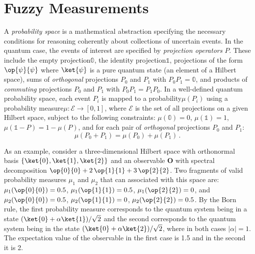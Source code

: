 \documentclass[english,reprint, aps, prl,superscriptaddress, showpacs,
showkeys, longbibliography, amsmath, amssymb]{revtex4-1}
\theoremstyle{plain}
\theoremstyle{definition}
\newcommand{\events}{\ensuremath{\mathcal{E}}}
\newcommand{\proj}[1]{\op{#1}{#1}}
\newcommand{\nb}{\nolinebreak[1] }
\begin{document}
\section{Fuzzy Measurements}
 \label{sec:fuzzy}
A \emph{probability space} is a mathematical abstraction specifying
the necessary conditions for reasoning coherently about collections of
uncertain events\nb\cite{Kolmogorov1950,544199,Griffiths2003,Grabisch2016}. In the quantum case, the
events of interest are specified by \emph{projection operators}
$P$. These include the empty projection\nb$\mathbb{0}$, the identity
projection\nb$\mathbb{1}$, projections of the form $\proj{\psi}$ where
$\ket{\psi}$ is a pure quantum state (an element of a Hilbert space),
sums of \emph{orthogonal} projections $P_0$ and $P_1$ with
$P_0P_1=\mathbb{0}$, and products of \emph{commuting} projections
$P_0$ and $P_1$ with $P_0P_1=P_1P_0$. In a well-defined quantum
probability
space\nb\cite{10.2307/2308516,gleason1957,Redhead1987-REDINA,Maassen2010},
each event $P_{i}$ is mapped to a probability\nb$\mu(P_{i})$ using
a probability measure\nb$\mu:\events\rightarrow[0,1]$, where $\events$
is the set of all projections on a given Hilbert space, subject to
the following constraints: $\mu(\mathbb{0})=0$, $\mu(\mathbb{1})=1$,
$\mu\left(\mathbb{1}-P\right)=1-\mu\left(P\right)$, and for each pair
of \emph{orthogonal} projections $P_{0}$ and $P_{1}$:
\begin{equation}
{\mu}\left(P_{0}+P_{1}\right)={\mu}\left(P_{0}\right)+{\mu}\left(P_{1}\right)\,.\label{eq:QuantumProbability-Addition}
\end{equation}

As an example, consider a three-dimensional Hilbert space with
orthonormal basis $\{\ket{0},\ket{1},\ket{2}\}$ and an observable
$\mathbf{O}$ with spectral decomposition
$\proj{0} + 2\,\proj{1} + 3\,\proj{2}$. Two fragments of valid
probability measures $\mu_1$ and $\mu_2$ that can associated with this
space are: $\mu_1(\proj{0}) = 0.5$, $\mu_1(\proj{1}) = 0.5$,
$\mu_1(\proj{2}) = 0$, and $\mu_2(\proj{0}) = 0.5$,
$\mu_2(\proj{1}) = 0$, $\mu_2(\proj{2}) = 0.5$. By the Born rule, the
first probability measure corresponds to the quantum system being in a
state $(\ket{0}+\alpha\ket{1})/\sqrt{2}$ and the second corresponds to
the quantum system being in the state
$(\ket{0}+\alpha\ket{2})/\sqrt{2}$, where in both cases
$|\alpha|=1$. The expectation value of the observable in the first
case is 1.5 and in the second it is 2.
\end{document}
